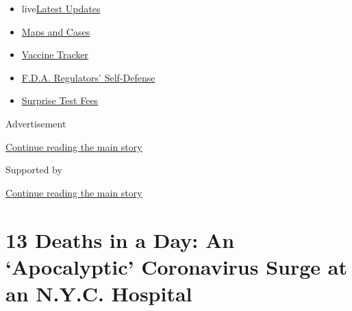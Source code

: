 \begin{itemize}
\tightlist
\item
  live\href{https://www.nytimes3xbfgragh.onion/2020/09/11/world/covid-19-coronavirus.html?name=styln-coronavirus-national\&region=TOP_BANNER\&block=storyline_menu_recirc\&action=click\&pgtype=Article\&impression_id=0f99bf11-f4ba-11ea-84d7-4d6fc60db97f\&variant=undefined}{Latest
  Updates}
\item
  \href{https://www.nytimes3xbfgragh.onion/interactive/2020/us/coronavirus-us-cases.html?name=styln-coronavirus-national\&region=TOP_BANNER\&block=storyline_menu_recirc\&action=click\&pgtype=Article\&impression_id=0f99bf12-f4ba-11ea-84d7-4d6fc60db97f\&variant=undefined}{Maps
  and Cases}
\item
  \href{https://www.nytimes3xbfgragh.onion/interactive/2020/science/coronavirus-vaccine-tracker.html?name=styln-coronavirus-national\&region=TOP_BANNER\&block=storyline_menu_recirc\&action=click\&pgtype=Article\&impression_id=0f99bf13-f4ba-11ea-84d7-4d6fc60db97f\&variant=undefined}{Vaccine
  Tracker}
\item
  \href{https://www.nytimes3xbfgragh.onion/2020/09/10/us/politics/fda-coronavirus-vaccine.html?name=styln-coronavirus-national\&region=TOP_BANNER\&block=storyline_menu_recirc\&action=click\&pgtype=Article\&impression_id=0f99bf14-f4ba-11ea-84d7-4d6fc60db97f\&variant=undefined}{F.D.A.
  Regulators' Self-Defense}
\item
  \href{https://www.nytimes3xbfgragh.onion/2020/09/09/upshot/coronavirus-surprise-test-fees.html?name=styln-coronavirus-national\&region=TOP_BANNER\&block=storyline_menu_recirc\&action=click\&pgtype=Article\&impression_id=0f99bf15-f4ba-11ea-84d7-4d6fc60db97f\&variant=undefined}{Surprise
  Test Fees}
\end{itemize}

Advertisement

\protect\hyperlink{after-top}{Continue reading the main story}

Supported by

\protect\hyperlink{after-sponsor}{Continue reading the main story}

\hypertarget{13-deaths-in-a-day-an-apocalyptic-coronavirus-surge-at-an-nyc-hospital}{%
\section{13 Deaths in a Day: An `Apocalyptic' Coronavirus Surge at an
N.Y.C.
Hospital}\label{13-deaths-in-a-day-an-apocalyptic-coronavirus-surge-at-an-nyc-hospital}}


